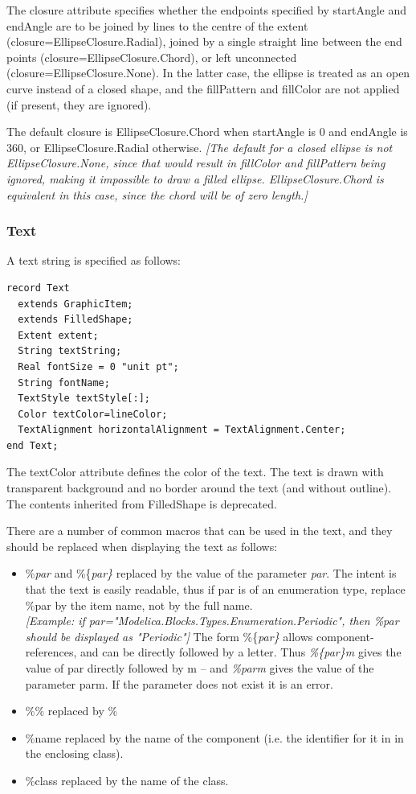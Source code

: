 \documentclass[10pt,a4paper]{report}
\def\doublelabel#1{\label{#1}}
\begin{document}
The closure attribute specifies whether the endpoints specified by
startAngle and endAngle are to be joined by lines to the centre of the
extent (closure=EllipseClosure.Radial), joined by a single straight line
between the end points (closure=EllipseClosure.Chord), or left
unconnected (closure=EllipseClosure.None). In the latter case, the
ellipse is treated as an open curve instead of a closed shape, and the
fillPattern and fillColor are not applied (if present, they are
ignored).

The default closure is EllipseClosure.Chord when startAngle is 0 and
endAngle is 360, or EllipseClosure.Radial otherwise. \emph{{[}The
default for a closed ellipse is not EllipseClosure.None, since that
would result in fillColor and fillPattern being ignored, making it
impossible to draw a filled ellipse. EllipseClosure.Chord is equivalent
in this case, since the chord will be of zero length.{]}}

\subsubsection{Text}\doublelabel{text}

A text string is specified as follows:

\begin{lstlisting}[language=modelica]
record Text
  extends GraphicItem;
  extends FilledShape;
  Extent extent;
  String textString;
  Real fontSize = 0 "unit pt";
  String fontName;
  TextStyle textStyle[:];
  Color textColor=lineColor;
  TextAlignment horizontalAlignment = TextAlignment.Center;
end Text;
\end{lstlisting}
The textColor attribute defines the color of the text. The text is drawn
with transparent background and no border around the text (and without
outline). The contents inherited from FilledShape is deprecated.

There are a number of common macros that can be used in the text, and
they should be replaced when displaying the text as follows:

\begin{itemize}
\item
  \%\emph{par} and \%\{\emph{par\}} replaced by the value of the
  parameter \emph{par}. The intent is that the text is easily readable,
  thus if par is of an enumeration type, replace \%par by the item name,
  not by the full name.\\
  \emph{{[}Example: if par="Modelica.Blocks.Types.Enumeration.Periodic",
  then \%par should be displayed as "Periodic"{]}} The form
  \%\{\emph{par\}} allows component-references, and can be directly
  followed by a letter. Thus \emph{\%\{par\}m} gives the value of par
  directly followed by m -- and \emph{\%parm} gives the value of the
  parameter parm. If the parameter does not exist it is an error.
\item
  \%\% replaced by \%
\item
  \%name replaced by the name of the component (i.e. the identifier for
  it in in the enclosing class).
\item
  \%class replaced by the name of the class.
\end{itemize}
\end{document}
